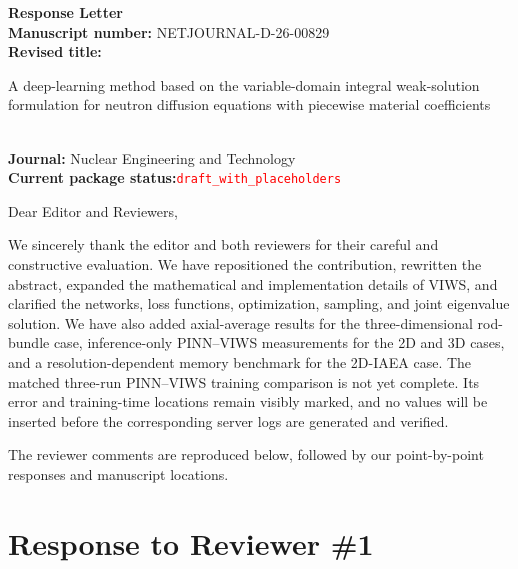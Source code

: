 \documentclass[11pt,a4paper]{article}
\begin{document}
\begin{center}
{\LARGE\textbf{Response Letter}}\\[1em]
\textbf{Manuscript number:} NETJOURNAL-D-26-00829\\
\textbf{Revised title:}\parbox[t]{0.82\textwidth}{\centering A deep-learning method based on the variable-domain integral weak-solution formulation for neutron diffusion equations with piecewise material coefficients}\\[0.5em]
\textbf{Journal:} Nuclear Engineering and Technology\\[0.5em]
\textbf{Current package status:}\textcolor{red}{\texttt{draft\_with\_placeholders}}
\end{center}

\vspace{1em}
Dear Editor and Reviewers,

We sincerely thank the editor and both reviewers for their careful and constructive evaluation. We have repositioned the contribution, rewritten the abstract, expanded the mathematical and implementation details of VIWS, and clarified the networks, loss functions, optimization, sampling, and joint eigenvalue solution. We have also added axial-average results for the three-dimensional rod-bundle case, inference-only PINN--VIWS measurements for the 2D and 3D cases, and a resolution-dependent memory benchmark for the 2D-IAEA case. The matched three-run PINN--VIWS training comparison is not yet complete. Its error and training-time locations remain visibly marked, and no values will be inserted before the corresponding server logs are generated and verified.

The reviewer comments are reproduced below, followed by our point-by-point responses and manuscript locations.

\section*{Response to Reviewer \#1}
\end{document}

